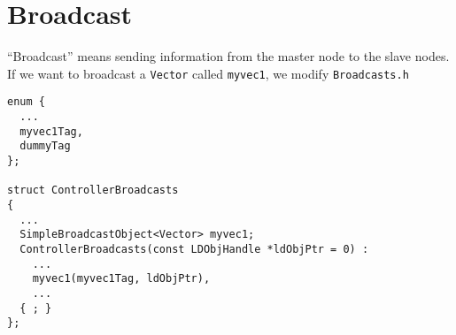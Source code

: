 \documentclass{article}
\begin{document}
\section{\label{sec:broadcast}Broadcast}

``Broadcast'' means sending information from the master node
to the slave nodes.
%
If we want to broadcast a \texttt{Vector} called \texttt{myvec1},
we modify \texttt{Broadcasts.h}
%
\begin{lstlisting}
enum {
  ...
  myvec1Tag,
  dummyTag
};

struct ControllerBroadcasts
{
  ...
  SimpleBroadcastObject<Vector> myvec1;
  ControllerBroadcasts(const LDObjHandle *ldObjPtr = 0) :
    ...
    myvec1(myvec1Tag, ldObjPtr),
    ...
  { ; }
};

\end{lstlisting}
\end{document}
